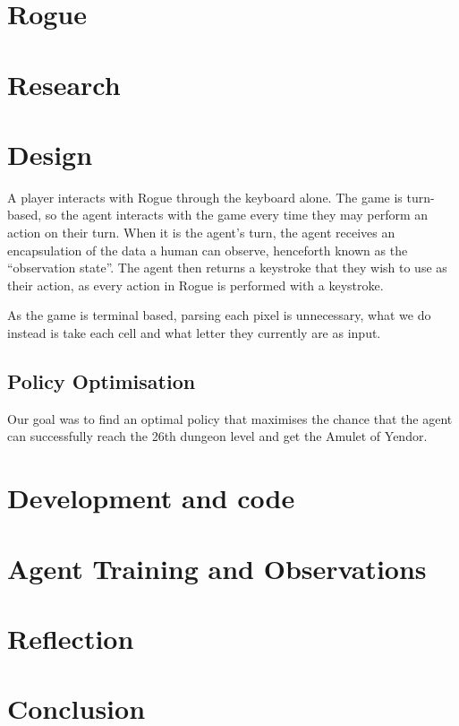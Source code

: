 \documentclass[11pt,a4paper]{article}
\begin{document}
\section{Rogue}

\section{Research}

\section{Design}
A player interacts with Rogue through the keyboard alone. The game is turn-based, so the agent interacts with the game every time they may perform an action on their turn. When it is the agent's turn, the agent receives an encapsulation of the data a human can observe, henceforth known as the ``observation state''. The agent then returns a keystroke that they wish to use as their action, as every action in Rogue is performed with a keystroke.

As the game is terminal based, parsing each pixel is unnecessary, what we do instead is take each cell and what letter they currently are as input.

\subsection{Policy Optimisation}
Our goal was to find an optimal policy that maximises the chance that the agent can successfully reach the 26th dungeon level and get the Amulet of Yendor.

\section{Development and code}

\section{Agent Training and Observations}

\section{Reflection}

\section{Conclusion}

\medskip



\end{document}
